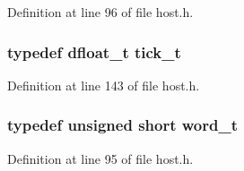Definition at line 96 of file host.h.
\subsubsection[{tick\_\-t}]{\setlength{\rightskip}{0pt plus 5cm}typedef {\bf dfloat\_\-t} {\bf tick\_\-t}}\label{host_8h_72c250924ea62bad7fee5d58765cdc86}




Definition at line 143 of file host.h.
\subsubsection[{word\_\-t}]{\setlength{\rightskip}{0pt plus 5cm}typedef unsigned short {\bf word\_\-t}}\label{host_8h_c28e484253fd62d727019f0d361996a0}




Definition at line 95 of file host.h.